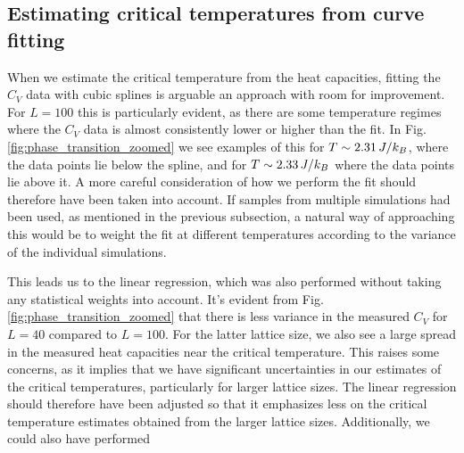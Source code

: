 \subsection{Estimating critical temperatures from curve fitting}
When we estimate the critical temperature from the heat capacities, fitting the $C_V$ data with cubic splines is arguable an approach with room for improvement. For $L=100$ this is particularly evident, as there are some temperature regimes where the $C_V$ data is almost consistently lower or higher than the fit. In Fig. \ref{fig:phase_transition_zoomed} we see examples of this for $T\sim2.31\,J/k_B$, where the data points lie below the spline, and for $T\sim2.33\,J/k_B$ where the data points lie above it. A more careful consideration of how we perform the fit should therefore have been taken into account. If samples from multiple simulations had been used, as mentioned in the previous subsection, a natural way of approaching this would be to weight the fit at different temperatures according to the variance of the individual simulations.  

This leads us to the linear regression, which was also performed without taking any statistical weights into account. It's evident from Fig. \ref{fig:phase_transition_zoomed} that there is less variance in the measured $C_V$ for $L=40$ compared to $L=100$. For the latter lattice size, we also see a large spread in the measured heat capacities near the critical temperature. This raises some concerns, as it implies that we have significant uncertainties in our estimates of the critical temperatures, particularly for larger lattice sizes. The linear regression should therefore have been adjusted so that it emphasizes less on the critical temperature estimates obtained from the larger lattice sizes. Additionally, we could also have performed  


